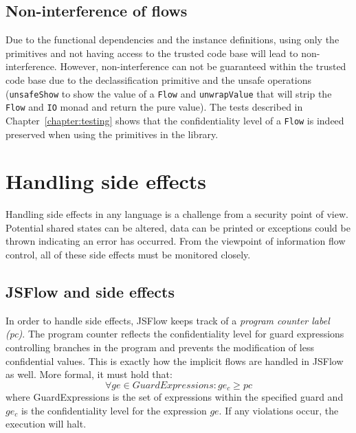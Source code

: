 \subsection{Non-interference of flows}
Due to the functional dependencies and the instance definitions, using only the primitives and not having access to the trusted code base will lead to non-interference. However, non-interference can not be guaranteed within the trusted code base due to the declassification primitive and the unsafe operations ({\tt unsafeShow} to show the value of a {\tt Flow} and {\tt unwrapValue} that will strip the {\tt Flow} and {\tt IO} monad and return the pure value). The tests described in Chapter~\ref{chapter:testing} shows that the confidentiality level of a {\tt Flow} is indeed preserved when using the primitives in the library.

\section{Handling side effects}
Handling side effects in any language is a challenge from a security point of view. Potential shared states can be altered, data can be printed or exceptions could be thrown indicating an error has occurred. From the viewpoint of information flow control, all of these side effects must be monitored closely.

\subsection{JSFlow and side effects}
In order to handle side effects, JSFlow keeps track of a \emph{program counter label (pc)}. The program counter reflects the confidentiality level for guard expressions controlling branches in the program and prevents the modification of less confidential values. This is exactly how the implicit flows are handled in JSFlow as well. More formal, it must hold that:
\[
\forall ge \in GuardExpressions: ge_c \geq pc
\]
where GuardExpressions is the set of expressions within the specified guard and \(ge_c\) is the confidentiality level for the expression \(ge\). If any violations occur, the execution will halt.

